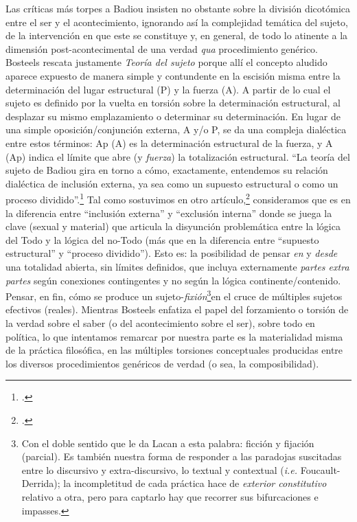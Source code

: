 Las críticas más torpes a Badiou  insisten no obstante sobre la división dicotómica entre el ser y el acontecimiento, ignorando así la complejidad temática del sujeto, de la intervención en que este se constituye y, en general, de todo lo atinente a la dimensión post-acontecimental de una verdad \emph{qua} procedimiento genérico. Bosteels rescata justamente \emph{Teoría del sujeto} porque allí el concepto aludido aparece expuesto de manera simple y contundente en la escisión misma entre la determinación del lugar estructural (P) y la fuerza (A). A partir de lo cual el sujeto es definido por la vuelta en torsión sobre la determinación estructural, al desplazar su mismo emplazamiento o determinar su determinación. En lugar de una simple oposición/conjunción externa, A y/o P, se da una compleja dialéctica entre estos términos: Ap (A) es la determinación estructural de la fuerza, y A (Ap) indica el límite que abre (y \emph{fuerza}) la totalización estructural. \enquote{La teoría del sujeto de Badiou gira en torno a cómo, exactamente, entendemos su relación dialéctica de inclusión externa, ya sea como un supuesto estructural o como un proceso dividido}.\footcite[][89]{@7022-BOSTEELS2007} Tal como sostuvimos en otro artículo,\footcite{@7071-FARRAN2009} consideramos que es en la diferencia entre \enquote{inclusión externa} y \enquote{exclusión interna} donde se juega la clave (sexual y material) que articula la disyunción problemática entre la lógica del Todo y la lógica del no-Todo (más que en la diferencia entre \enquote{supuesto estructural} y \enquote{proceso dividido}). Esto es: la posibilidad de pensar \emph{en} y \emph{desde} una totalidad abierta, sin límites definidos, que incluya externamente \emph{partes extra partes} según conexiones contingentes y no según la lógica continente/contenido. Pensar, en fin, cómo se produce un sujeto-\emph{fixión}\footnote{Con el doble sentido que le da Lacan a esta palabra: ficción y fijación (parcial). Es también nuestra forma de responder a las paradojas suscitadas entre lo discursivo y extra-discursivo, lo textual y contextual (\emph{i.e.} Foucault-Derrida); la incompletitud de cada práctica hace de \emph{exterior constitutivo} relativo a otra, pero para captarlo hay que recorrer sus bifurcaciones e impasses.}en el cruce de múltiples sujetos efectivos (reales). Mientras Bosteels enfatiza el papel del forzamiento o torsión de la verdad sobre el saber (o del acontecimiento sobre el ser), sobre todo en política, lo que intentamos remarcar por nuestra parte es la materialidad misma de la práctica filosófica, en las múltiples torsiones conceptuales producidas entre los diversos procedimientos genéricos de verdad (o sea, la composibilidad).

